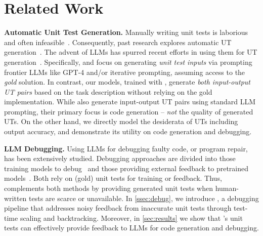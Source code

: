 \section{Related Work}
\noindent\textbf{Automatic Unit Test Generation. \hspace{0.5em}} Manually writing unit tests is laborious and often infeasible~\cite{chencodet,liu2024your}. Consequently, past research explores automatic UT generation~\citep[][\emph{inter alia}]{king1976symbolic,cadar2008klee,holler2012fuzzing,cha2015program}. The advent of LLMs has spurred recent efforts in using them for UT generation~\cite{chencodet,schafer2023empirical,liu2024your}. Specifically, \citet{schafer2023empirical} and \citet{liu2024your} focus on generating \emph{unit test inputs} via prompting frontier LLMs like GPT-4 and/or iterative prompting, assuming access to the \emph{gold} solution. 
In contrast, our models, trained with \method{}, generate \emph{both input-output UT pairs} based on the task description without relying on the gold implementation. 
While \citet{chencodet} also generate input-output UT pairs using standard LLM prompting, their primary focus is code generation -- \emph{not} the quality of generated UTs. On the other hand, we directly model the desiderata of UTs including output accuracy, and demonstrate its utility on code generation and debugging.

\vspace{0.35em}
\noindent\textbf{LLM Debugging. \hspace{0.5em}} Using LLMs for debugging faulty code, or program repair, has been extensively studied. Debugging approaches are divided into those training models to debug~\cite{moon2023coffee,ninext,chae2024coffee} and those providing external feedback to pretrained models~\cite{chen2023teaching,olausson2023self,zhong2024ldb}. Both rely on (gold) unit tests for training or feedback. Thus, \method{} complements both methods by providing generated unit tests when human-written tests are scarce or unavailable.  In \cref{ssec:debug}, we introduce \debugmethod{}, a debugging pipeline that addresses noisy feedback from inaccurate unit tests through test-time scaling and backtracking. Moreover, in \cref{sec:results} we show that \method{}'s unit tests can effectively provide feedback to LLMs for code generation and debugging.